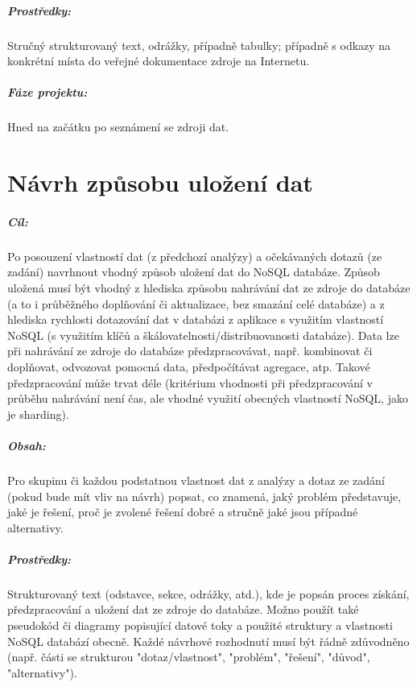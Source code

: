 \documentclass[10pt,xcolor=pdflatex,dvipsnames,table,oneside]{book}
\begin{document}
\paragraph{Prostředky:}
Stručný strukturovaný text, odrážky, případně tabulky; případně s odkazy na konkrétní místa do veřejné dokumentace zdroje na Internetu.

\paragraph{Fáze projektu:}
Hned na začátku po seznámení se zdroji dat.

\chapter{Návrh způsobu uložení dat}

\paragraph{Cíl:}
Po posouzení vlastností dat (z předchozí analýzy) a očekávaných dotazů (ze zadání) navrhnout vhodný způsob uložení dat do NoSQL databáze.
Způsob uložená musí být vhodný z hlediska způsobu nahrávání dat ze zdroje do databáze (a to i průběžného doplňování či aktualizace, bez smazání celé databáze)
a z hlediska rychlosti dotazování dat v databázi z aplikace s využitím vlastností NoSQL (s využitím klíčů a škálovatelnosti/distribuovanosti databáze).
Data lze při nahrávání ze zdroje do databáze předzpracovávat, např. kombinovat či doplňovat, odvozovat pomocná data, předpočítávat agregace, atp.
Takové předzpracování může trvat déle (kritérium vhodnosti při předzpracování v průběhu nahrávání není čas, ale vhodné využití obecných vlastností NoSQL, jako je sharding).

\paragraph{Obsah:}
Pro skupinu či každou podstatnou vlastnost dat z analýzy a dotaz ze zadání (pokud bude mít vliv na návrh) popsat,
co znamená, jaký problém představuje, jaké je řešení, proč je zvolené řešení dobré a stručně jaké jsou případné alternativy.

\paragraph{Prostředky:}
Strukturovaný text (odstavce, sekce, odrážky, atd.), kde je popsán proces získání, předzpracování a uložení dat ze zdroje do databáze.
Možno použít také pseudokód či diagramy popisující datové toky a použité struktury a vlastnosti NoSQL databází obecně.
Každé návrhové rozhodnutí musí být řádně zdůvodněno (např. části se strukturou "dotaz/vlastnost", "problém", "řešení", "důvod", "alternativy").
\end{document}
